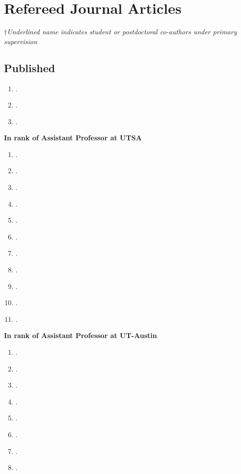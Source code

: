 \section*{Refereed Journal Articles}
\ifdefined\iscockrell
$\dagger$\emph{\footnotesize Underlined name indicates student or postdoctoral co-authors under primary supervision}
\fi

\subsection*{Published}
\ifdefined\iscockrell
\begin{enumerate}
%
    \item {}.
    \item {}.
    \item {}.
%
\end{enumerate}
    \pagebreak[2]
    \textbf{In rank of Assistant Professor at UTSA}
\begin{enumerate}[resume]
    \item {}.
    \item {}.
    \item {}.
    \item {}.
    \item {}.
    \item {}.
    \item {}.
    \item {}.
    \item {}.
    \item {}.
    \item {}.
\end{enumerate}
    \pagebreak[2]
    \textbf{In rank of Assistant Professor at UT-Austin}
\begin{enumerate}[resume]
	\item {}.
	\item {}.
    \item {}.
    \item {}.
    \item {}.
    \item {}.
	\item {}.
	\item {}.
\end{enumerate}
